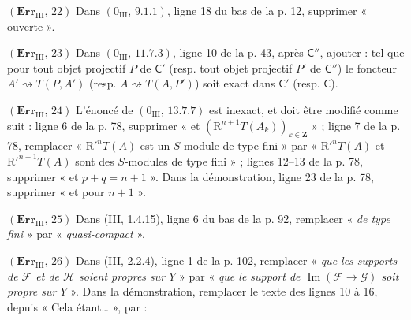 \noindent\textbf{$(\mathbf{Err}_{\mathrm{III}},\,22)$} Dans
$(0_{\mathrm{III}},\,9.1.1)$, ligne 18 du bas de la p. 12, supprimer
« ouverte ».

\noindent\textbf{$(\mathbf{Err}_{\mathrm{III}},\,23)$} Dans
$(0_{\mathrm{III}},\,11.7.3)$, ligne 10 de la p. 43, après $\mathsf C''$,
ajouter : tel que pour tout objet projectif $P$ de $\mathsf C'$ (resp. tout
objet projectif $P'$ de $\mathsf C''$) le foncteur
$A'\rightsquigarrow T(P,A')$ (resp. $A\rightsquigarrow T(A,P')$) soit exact
dans $\mathsf C'$ (resp. $\mathsf C$).

\noindent\textbf{$(\mathbf{Err}_{\mathrm{III}},\,24)$} L'énoncé de
$(0_{\mathrm{III}},\,13.7.7)$ est inexact, et doit être modifié comme suit :
ligne 6 de la p. 78, supprimer « et
$(\mathrm R^{n+1}T(A_k))_{k\in\mathbf Z}$ » ; ligne 7 de la p. 78, remplacer
« $\mathrm R'^nT(A)$ est un $S$-module de type fini » par
« $\mathrm R'^nT(A)$ et $\mathrm R'^{n+1}T(A)$ sont des $S$-modules de type
fini » ; lignes 12--13 de la p. 78, supprimer « et $p+q=n+1$ ». Dans la
démonstration, ligne 23 de la p. 78, supprimer « et pour $n+1$ ».

\noindent\textbf{$(\mathbf{Err}_{\mathrm{III}},\,25)$} Dans (III, 1.4.15),
ligne 6 du bas de la p. 92, remplacer « \emph{de type fini} » par
« \emph{quasi-compact} ».

\noindent\textbf{$(\mathbf{Err}_{\mathrm{III}},\,26)$} Dans (III, 2.2.4),
ligne 1 de la p. 102, remplacer « \emph{que les supports de $\mathscr F$ et de
$\mathscr H$ soient propres sur $Y$} » par « \emph{que le support de
$\operatorname{Im}(\mathscr F\to\mathscr G)$ soit propre sur $Y$} ». Dans la
démonstration, remplacer le texte des lignes 10 à 16, depuis « Cela
étant\ldots{} », par :

